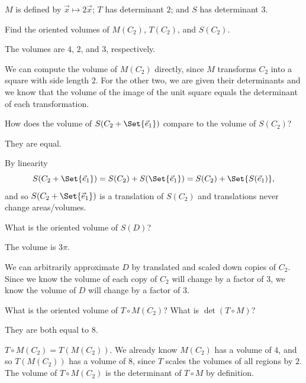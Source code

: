 \documentclass{problemset}
\begin{document}
	$M$ is defined
	by $\vec x\mapsto 2\vec x$; $T$ has determinant $2$; and $S$ has determinant $3$.
	\begin{parts}
		\item Find the oriented volumes of $M(C_2)$, $T(C_2)$, and $S(C_2)$.
			\begin{solution}
				The volumes are $4$, $2$, and $3$, respectively.

				We can compute the volume of $M(C_2)$ directly, since $M$
				transforms $C_2$ into a square with side length $2$. For the
				other two, we are given their determinants and we know that the
				volume of the image of the unit square equals the determinant of
				each transformation.
			\end{solution}
		\item How does the volume of $S(C_2+\Set{\vec e_1})$ compare to the volume
			of $S(C_2)$?
			\begin{solution}
				They are equal. 
				
				By linearity
				\[
					S(C_2+\Set{\vec e_1})=S(C_2)+S(\Set{\vec e_1}) = S(C_2)+\Set{S(\vec e_1)},
				\]
				and so $S(C_2+\Set{\vec e_1})$ is a translation of $S(C_2)$ and translations never change
				areas/volumes.
			\end{solution}
		\item What is the oriented volume of $S(D)$?
			\begin{solution}
				The volume is $3\pi$. 
				
				We can arbitrarily approximate $D$ by translated and scaled down copies of
				$C_2$. Since we know the volume of each copy of $C_2$ will change by a factor of $3$, we know the volume
				of $D$ will change by a factor of $3$.
			\end{solution}
		\item What is the oriented volume of $T\circ M(C_2)$? What is $\det(T\circ M)$?
			\begin{solution}
				They are both equal to $8$.

				$T\circ M(C_2)=T(M(C_2))$. We already know $M(C_2)$ has a volume
				of $4$, and so $T(M(C_2))$ has a volume of 8, since $T$ scales
				the volumes of all regions by $2$. The volume of $T\circ M(C_2)$
				is the determinant of $T\circ M$ by definition.
			\end{solution}
	\end{parts}
\end{document}
